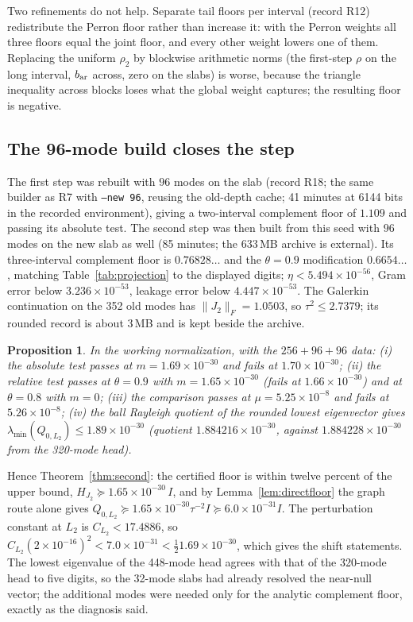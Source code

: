 \documentclass[11pt]{article}
\numberwithin{equation}{section}
\newtheorem{proposition}[theorem]{Proposition}
\theoremstyle{definition}
\theoremstyle{remark}
\newcommand{\norm}[1]{\lVert#1\rVert}
\newcommand{\Ltwo}{L_2}
\newcommand{\UpperLtwo}{1.89\times10^{-30}}                 %
\newcommand{\FloorTwo}{1.69\times10^{-30}}          %
\newcommand{\FloorRelTwo}{1.65\times10^{-30}}       %
\newcommand{\ThetaTwo}{0.8}                         %
\newcommand{\MuTwoB}{5.25\times10^{-8}}             %
\newcommand{\ShiftTwo}{2\times10^{-16}}             %
\begin{document}
Two refinements do not help. Separate tail floors per interval (record R12) redistribute the Perron floor rather than increase it: with the Perron weights all three floors equal the joint floor, and every other weight lowers one of them. Replacing the uniform $\rho_2$ by blockwise arithmetic norms (the first-step $\rho$ on the long interval, $b_{\rm ar}$ across, zero on the slabs) is worse, because the triangle inequality across blocks loses what the global weight captures; the resulting floor is negative.

\subsection{The 96-mode build closes the step}\label{sec:build96}
The first step was rebuilt with $96$ modes on the slab (record R18; the same builder as R7 with \texttt{--new 96}, reusing the old-depth cache; 41 minutes at 6144 bits in the recorded environment), giving a two-interval complement floor of $1.109$ and passing its absolute test. The second step was then built from this seed with $96$ modes on the new slab as well (85 minutes; the $633$\,MB archive is external). Its three-interval complement floor is $0.76828\ldots$ and the $\theta=0.9$ modification $0.6654\ldots$, matching Table~\ref{tab:projection} to the displayed digits; $\eta<5.494\times10^{-56}$, Gram error below $3.236\times10^{-53}$, leakage error below $4.447\times10^{-53}$. The Galerkin continuation on the 352 old modes has $\norm{J_2}_F=1.0503$, so $\tau^2\le2.7379$; its rounded record is about $3$\,MB and is kept beside the archive.

\begin{proposition}\label{prop:second96}
In the working normalization, with the $256+96+96$ data: (i) the absolute test passes at $m=\FloorTwo$ and fails at $1.70\times10^{-30}$; (ii) the relative test passes at $\theta=0.9$ with $m=\FloorRelTwo$ (fails at $1.66\times10^{-30}$) and at $\theta=\ThetaTwo$ with $m=0$; (iii) the comparison passes at $\mu=\MuTwoB$ and fails at $5.26\times10^{-8}$; (iv) the ball Rayleigh quotient of the rounded lowest eigenvector gives $\lambda_{\min}(Q_{0,\Ltwo})\le\UpperLtwo$ (quotient $1.884216\times10^{-30}$, against $1.884228\times10^{-30}$ from the 320-mode head).
\end{proposition}
Hence Theorem~\ref{thm:second}: the certified floor is within twelve percent of the upper bound, $H_{J_2}\succeq\FloorRelTwo\,I$, and by Lemma~\ref{lem:directfloor} the graph route alone gives $Q_{0,\Ltwo}\succeq\FloorRelTwo\tau^{-2}I\succeq6.0\times10^{-31}I$. The perturbation constant at $\Ltwo$ is $C_{\Ltwo}<17.4886$, so $C_{\Ltwo}(\ShiftTwo)^2<7.0\times10^{-31}<\tfrac12\FloorTwo$, which gives the shift statements. The lowest eigenvalue of the 448-mode head agrees with that of the 320-mode head to five digits, so the 32-mode slabs had already resolved the near-null vector; the additional modes were needed only for the analytic complement floor, exactly as the diagnosis said.
\end{document}
